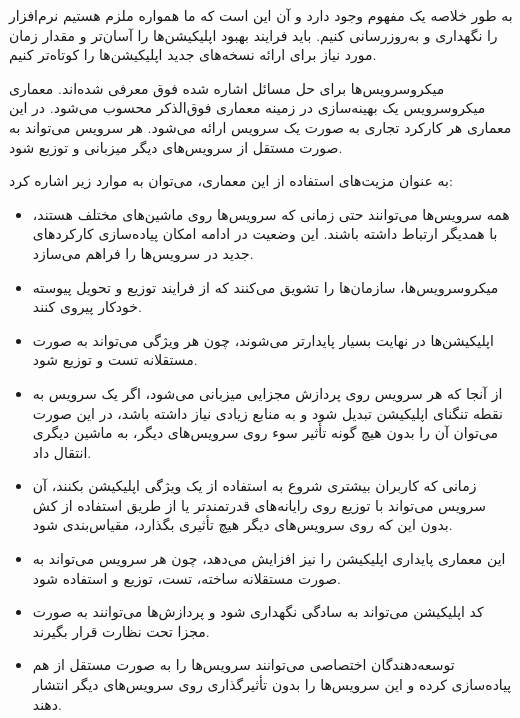 به طور خلاصه یک مفهوم وجود دارد و آن این است که ما همواره ملزم هستیم نرم‌افزار را نگهداری و به‌روزرسانی کنیم. باید فرایند بهبود اپلیکیشن‌ها را آسان‌تر و مقدار زمان مورد نیاز برای ارائه نسخه‌های جدید اپلیکیشن‌ها را کوتاه‌تر کنیم.

میکروسرویس‌ها برای حل مسائل اشاره شده فوق معرفی شده‌اند. معماری میکروسرویس یک بهینه‌سازی در زمینه معماری فوق‌الذکر محسوب می‌شود. در این معماری هر کارکرد تجاری به صورت یک سرویس ارائه می‌شود. هر سرویس می‌تواند به صورت مستقل از سرویس‌های دیگر میزبانی و توزیع شود.

به عنوان مزیت‌های استفاده از این معماری، می‌توان به موارد زیر اشاره کرد:
\begin{itemize}

\item
همه سرویس‌ها می‌توانند حتی زمانی که سرویس‌ها روی ماشین‌های مختلف هستند، با همدیگر ارتباط داشته باشند. این وضعیت در ادامه امکان پیاده‌سازی کارکردهای جدید در سرویس‌ها را فراهم می‌سازد.

\item
میکروسرویس‌ها، سازمان‌ها را تشویق می‌کنند که از فرایند توزیع و تحویل پیوسته خودکار پیروی کنند.

\item
اپلیکیشن‌ها در نهایت بسیار پایدارتر می‌شوند، چون هر ویژگی می‌تواند به صورت مستقلانه تست و توزیع شود.

\item
از آنجا که هر سرویس روی پردازش مجزایی میزبانی می‌شود، اگر یک سرویس به نقطه تنگنای اپلیکیشن تبدیل شود و به منابع زیادی نیاز داشته باشد، در این صورت می‌توان آن را بدون هیچ گونه تأثیر سوء روی سرویس‌های دیگر، به ماشین دیگری انتقال داد.

\item
زمانی که کاربران بیشتری شروع به استفاده از یک ویژگی اپلیکیشن بکنند، آن سرویس می‌تواند با توزیع روی رایانه‌های قدرتمندتر یا از طریق استفاده از کش بدون این که روی سرویس‌های دیگر هیچ تأثیری بگذارد، مقیاس‌بندی شود.

\item
این معماری پایداری اپلیکیشن را نیز افزایش می‌دهد، چون هر سرویس می‌تواند به صورت مستقلانه ساخته، تست، توزیع و استفاده شود.

\item
کد اپلیکیشن می‌تواند به سادگی نگهداری شود و پردازش‌ها می‌توانند به صورت مجزا تحت نظارت قرار بگیرند.

\item
توسعه‌دهندگان اختصاصی می‌توانند سرویس‌ها را به صورت مستقل از هم پیاده‌سازی کرده و این سرویس‌ها را بدون تأثیرگذاری روی سرویس‌های دیگر انتشار دهند.


\end{itemize}
